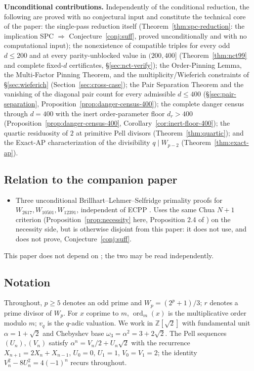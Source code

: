 \documentclass[11pt]{amsart}
\theoremstyle{plain}
\theoremstyle{definition}
\theoremstyle{remark}
\numberwithin{equation}{section}
\newcommand{\ord}{\operatorname{ord}}
\newcommand{\Z}{\mathbb{Z}}
\begin{document}
\textbf{Unconditional contributions.} Independently of the conditional reduction, the following are proved with no conjectural input and constitute the technical core of the paper: the single-pass reduction itself (Theorem~\ref{thm:spc-reduction}: the implication SPC $\Rightarrow$ Conjecture~\ref{conj:suff}, proved unconditionally and with no computational input); the nonexistence of compatible triples for every odd $d \leq 200$ and at every parity-unblocked value in $(200, 400]$ (Theorem~\ref{thm:nct99} and complete fixed-$d$ certificates, \S\ref{sec:nct-verify}); the Order-Pinning Lemma, the Multi-Factor Pinning Theorem, and the multiplicity/Wieferich constraints of \S\ref{sec:wieferich} (Section~\ref{sec:cross-case}); the Pair Separation Theorem and the vanishing of the diagonal pair count for every admissible $d \leq 400$ (\S\ref{sec:pair-separation}, Proposition~\ref{prop:danger-census-400}); the complete danger census through $d = 400$ with the inert order-parameter floor $d_r > 400$ (Proposition~\ref{prop:danger-census-400}, Corollary~\ref{cor:inert-floor-400}); the quartic residuosity of $2$ at primitive Pell divisors (Theorem~\ref{thm:quartic}); and the Exact-AP characterization of the divisibility $q \mid W_{p-2}$ (Theorem~\ref{thm:exact-ap}).

\subsection{Relation to the companion paper}

\begin{itemize}
\item \textbf{\cite{ref:A}} Three unconditional Brillhart--Lehmer--Selfridge \cite{ref:BLS} primality proofs for $W_{2617}, W_{10501}, W_{12391}$, independent of ECPP \cite{ref:AtkinMorain}. Uses the same Chua $N + 1$ criterion (Proposition~\ref{prop:necessity} here, Proposition 2.4 of \cite{ref:A}) on the necessity side, but is otherwise disjoint from this paper: it does not use, and does not prove, Conjecture~\ref{conj:suff}.
\end{itemize}

This paper does not depend on \cite{ref:A}; the two may be read independently.

\subsection{Notation}\label{sec:notation}

Throughout, $p \geq 5$ denotes an odd prime and $W_p = (2^p + 1)/3$; $r$ denotes a prime divisor of $W_p$. For $x$ coprime to $m$, $\ord_m(x)$ is the multiplicative order modulo $m$; $v_q$ is the $q$-adic valuation. We work in $\Z[\sqrt 2]$ with fundamental unit $\alpha = 1 + \sqrt 2$ and Chebyshev base $\omega_3 = \alpha^2 = 3 + 2\sqrt 2$. The Pell sequences $(U_n), (V_n)$ satisfy $\alpha^n = V_n/2 + U_n \sqrt 2$ with the recurrence $X_{n+1} = 2 X_n + X_{n-1}$, $U_0 = 0$, $U_1 = 1$, $V_0 = V_1 = 2$; the identity $V_n^2 - 8 U_n^2 = 4(-1)^n$ recurs throughout.
\end{document}
